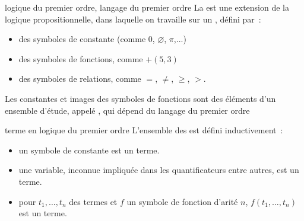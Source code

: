 \begin{adjustwidth}{-3cm}{-3cm}
\begin{definition}{7.20}{logique du premier ordre, langage du premier ordre}
    La  est une extension de la logique propositionnelle, dans laquelle on travaille sur un , défini par~:
    \begin{itemize}
        \item des symboles de constante (comme $0$, $\varnothing$, $\pi$,...)
        \item des symboles de fonctions, comme $+ (5,3)$
        \item des symboles de relations, comme $=$, $\neq$, $\geq$, $>$.
    \end{itemize}
    Les constantes et images des symboles de fonctions sont des éléments d'un ensemble d'étude, appelé , qui dépend du langage du premier ordre
\end{definition}

\begin{definition}{7.21}{terme en logique du premier ordre}
    L'ensemble des  est défini inductivement~:
    \begin{itemize}
        \item un symbole de constante est un terme.
        \item une variable, inconnue impliquée dans les quantificateurs entre autres, est un terme.
        \item pour $t_1, \dots, t_n$ des termes et $f$ un symbole de fonction d'arité $n$, $f(t_1, \dots, t_n)$ est un terme.
    \end{itemize}
\end{definition}


\end{adjustwidth}
